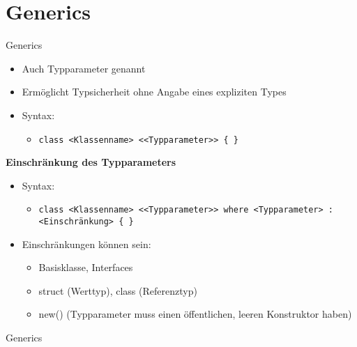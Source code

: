 \section{Generics}
\begin{frame}{Generics}
	\begin{itemize}
		\item Auch Typparameter genannt
		\item Ermöglicht Typsicherheit ohne Angabe eines expliziten Types
		\item Syntax:
		\begin{itemize}
			\item \texttt{class \alert{<Klassenname>} <\alert{<Typparameter>}> \{ \}}
		\end{itemize}
	\end{itemize}
	\textbf{Einschränkung des Typparameters}\\
	\begin{itemize}
		\item Syntax:
		\begin{itemize}
			\item \texttt{class \alert{<Klassenname>} <\alert{<Typparameter>}> where \alert{<Typparameter>} : \alert{<Einschränkung>} \{ \}}
		\end{itemize}
		\item Einschränkungen können sein:
		\begin{itemize}
			\item Basisklasse, Interfaces
			\item \alert{struct} (Werttyp), \alert{class} (Referenztyp)
			\item \alert{new()} (Typparameter muss einen öffentlichen, leeren Konstruktor haben)
		\end{itemize}
	\end{itemize}
\end{frame}

\begin{frame}{Generics}
	
	
\end{frame}

